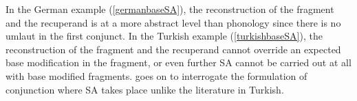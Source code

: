 In the German example (\ref{germanbaseSA}), the reconstruction of the fragment and the recuperand is at a more abstract level than phonology since there is no umlaut in the first conjunct. In the Turkish example (\ref{turkishbaseSA}), the reconstruction of the fragment and the recuperand cannot override an expected base modification in the fragment, or even further SA cannot be carried out at all with base modified fragments. \citet{pounder2006broken} goes on to interrogate the formulation of conjunction where SA takes place unlike the literature in Turkish.































